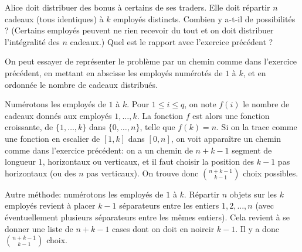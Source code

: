 \begin{exo}
Alice doit distribuer des bonus à certains de ses traders. Elle doit répartir $n$ cadeaux (tous identiques) à $k$ employés distincts. Combien y a-t-il de possibilités ? (Certains employés peuvent ne rien recevoir du tout et on doit distribuer l'intégralité des $n$ cadeaux.) Quel est le rapport avec l'exercice précédent ?

\begin{hint} %
On peut essayer de représenter le problème par un chemin comme dans l'exercice précédent, en mettant en abscisse les employés numérotés de $1$ à $k$, et en ordonnée le nombre de cadeaux distribués.
\end{hint}

\begin{sol} %
Numérotons les employés de $1$ à $k$. Pour $1 \le i \le q$, on note $f(i)$ le nombre de cadeaux donnés aux employés $1, \dots,k$. La fonction $f$ est alors une fonction croissante, de $\{1, \dots,k\}$ dans $\{0, \dots,n\}$, telle que $f(k)=n$. Si on la trace comme une fonction en escalier de $[1,k]$ dans $[0,n]$, on voit apparaître un chemin comme dans l'exercice précédent: on a un chemin de $n+k-1$ segment de longueur $1$, horizontaux ou verticaux, et il faut choisir la position des $k-1$ pas horizontaux (ou des $n$ pas verticaux). On trouve donc $\binom{n+k-1}{k-1}$ choix possibles.

Autre méthode: numérotons les employés de $1$ à $k$. Répartir $n$ objets sur les $k$ employés revient à placer $k-1$ séparateurs entre les entiers $1, 2, ..., n$ (avec éventuellement plusieurs séparateurs entre les mêmes entiers). Cela revient à se donner une liste de $n+k-1$ cases dont on doit en noircir $k-1$. Il y a donc $\binom{n+k-1}{k-1}$ choix.



\end{sol}
\end{exo}

